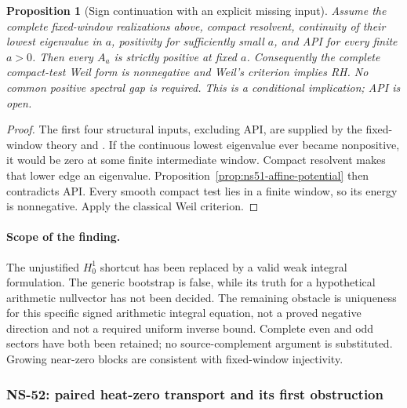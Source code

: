 \documentclass[11pt]{article}
\newtheorem{proposition}[theorem]{Proposition}
\theoremstyle{remark}
\begin{document}
\begin{proposition}[Sign continuation with an explicit missing input]
\label{prop:ns51-sign-continuation}
Assume the complete fixed-window realizations above, compact resolvent,
continuity of their lowest eigenvalue in $a$, positivity for sufficiently
small $a$, and API for every finite $a>0$. Then every $A_a$ is strictly
positive at fixed $a$. Consequently the complete compact-test Weil
form is nonnegative and Weil's criterion implies RH. No common positive
spectral gap is required. This is a conditional implication; API is open.
\end{proposition}
\begin{proof}
The first four structural inputs, excluding API, are supplied by the
fixed-window theory and \cite[Theorems 1.3--1.4]{Suzuki2026}.
If the continuous lowest eigenvalue ever became nonpositive, it would
be zero at some finite intermediate window. Compact resolvent makes
that lower edge an eigenvalue. Proposition~\ref{prop:ns51-affine-potential}
then contradicts API. Every smooth compact test lies in a finite window,
so its energy is nonnegative. Apply the classical Weil criterion.
\end{proof}

\paragraph{Scope of the finding.}
The unjustified $H_0^1$ shortcut has been replaced by a valid weak
integral formulation. The generic bootstrap is false, while its truth
for a hypothetical arithmetic nullvector has not been decided. The
remaining obstacle is uniqueness for this specific signed arithmetic
integral equation, not a proved negative direction and not a required
uniform inverse bound. Complete even and odd sectors have both been
retained; no source-complement argument is substituted. Growing
near-zero blocks are consistent with fixed-window injectivity.


\subsubsection*{NS-52: paired heat-zero transport and its first obstruction}
\end{document}
